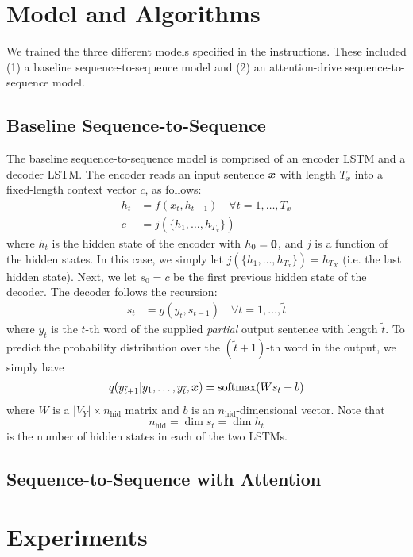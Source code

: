 \documentclass[11pt]{article}
\begin{document}
\section{Model and Algorithms}

We trained the three different models specified in the instructions.  These included (1) a baseline sequence-to-sequence model and (2) an attention-drive sequence-to-sequence model.

\subsection{Baseline Sequence-to-Sequence}
The baseline sequence-to-sequence model is comprised of an encoder LSTM and a decoder LSTM.  The encoder reads an input sentence $\boldsymbol{x}$ with length $T_x$ into a fixed-length context vector $c$, as follows:
\begin{align*}
h_t &= f(x_t, h_{t-1}) \quad \forall t = 1, \ldots, T_x \\
c &= j(\{h_1, \ldots, h_{T_x}\})
\end{align*}  
where $h_t$ is the hidden state of the encoder with $h_0 = \bold{0}$, and $j$ is a function of the hidden states.  In this case, we simply let $j(\{h_1, \ldots, h_{T_x}\}) = h_{T_X}$ (i.e. the last hidden state).  Next, we let $s_0 = c$ be the first previous hidden state of the decoder.  The decoder follows the recursion:
\begin{align*}
s_t &= g(y_t, s_{t-1}) \quad \forall t = 1, \ldots, \tilde{t}
\end{align*}
where $y_t$ is the $t$-th word of the supplied \emph{partial} output sentence with length $\tilde{t}$.  To predict the probability distribution over the $(\tilde{t} + 1)$-th word in the output, we simply have
\begin{align*}
q(y_{\tilde{t} + 1} \vert y_1, \ldots, y_{\tilde t}, \boldsymbol{x}) = \text{softmax}(W s_t + b)
\end{align*}  
where $W$ is a $\lvert V_Y \rvert \times n_\text{hid}$ matrix and $b$ is an $n_\text{hid}$-dimensional vector.  Note that 
$$n_\text{hid} = \dim s_t = \dim h_t$$
is the number of hidden states in each of the two LSTMs.

\subsection{Sequence-to-Sequence with Attention}
           


\section{Experiments}
\end{document}
